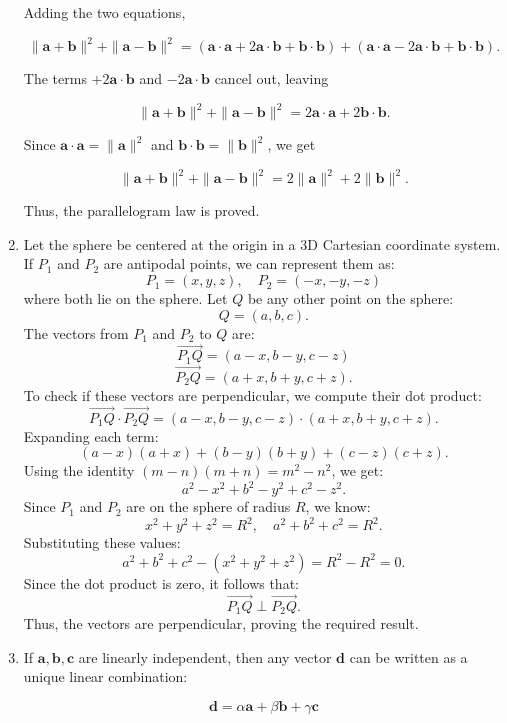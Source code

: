 \documentclass[12pt]{article}
\begin{document}
\begin{enumerate}
Adding the two equations,

\[
\|\mathbf{a} + \mathbf{b}\|^2 + \|\mathbf{a} - \mathbf{b}\|^2 =
(\mathbf{a} \cdot \mathbf{a} + 2 \mathbf{a} \cdot \mathbf{b} + \mathbf{b} \cdot \mathbf{b}) +
(\mathbf{a} \cdot \mathbf{a} - 2 \mathbf{a} \cdot \mathbf{b} + \mathbf{b} \cdot \mathbf{b}).
\]

The terms \(+2 \mathbf{a} \cdot \mathbf{b}\) and \(-2 \mathbf{a} \cdot \mathbf{b}\) cancel out, leaving

\[
\|\mathbf{a} + \mathbf{b}\|^2 + \|\mathbf{a} - \mathbf{b}\|^2 = 2 \mathbf{a} \cdot \mathbf{a} + 2 \mathbf{b} \cdot \mathbf{b}.
\]

Since \(\mathbf{a} \cdot \mathbf{a} = \|\mathbf{a}\|^2\) and \(\mathbf{b} \cdot \mathbf{b} = \|\mathbf{b}\|^2\), we get

\[
\|\mathbf{a} + \mathbf{b}\|^2 + \|\mathbf{a} - \mathbf{b}\|^2 = 2 \|\mathbf{a}\|^2 + 2 \|\mathbf{b}\|^2.
\]

Thus, the parallelogram law is proved.
\item 
Let the sphere be centered at the origin in a 3D Cartesian coordinate system. If \( P_1 \) and \( P_2 \) are antipodal points, we can represent them as:
\[
P_1 = (x, y, z), \quad P_2 = (-x, -y, -z)
\]
where both lie on the sphere. Let \( Q \) be any other point on the sphere:
\[
Q = (a, b, c).
\]
The vectors from \( P_1 \) and \( P_2 \) to \( Q \) are:
\[
\overrightarrow{P_1Q} = (a-x, b-y, c-z)
\]
\[
\overrightarrow{P_2Q} = (a+x, b+y, c+z).
\]
To check if these vectors are perpendicular, we compute their dot product:
\[
\overrightarrow{P_1Q} \cdot \overrightarrow{P_2Q} = (a-x, b-y, c-z) \cdot (a+x, b+y, c+z).
\]
Expanding each term:
\[
(a-x)(a+x) + (b-y)(b+y) + (c-z)(c+z).
\]
Using the identity \( (m-n)(m+n) = m^2 - n^2 \), we get:
\[
a^2 - x^2 + b^2 - y^2 + c^2 - z^2.
\]
Since \( P_1 \) and \( P_2 \) are on the sphere of radius \( R \), we know:
\[
x^2 + y^2 + z^2 = R^2, \quad a^2 + b^2 + c^2 = R^2.
\]
Substituting these values:
\[
a^2 + b^2 + c^2 - (x^2 + y^2 + z^2) = R^2 - R^2 = 0.
\]
Since the dot product is zero, it follows that:
\[
\overrightarrow{P_1Q} \perp \overrightarrow{P_2Q}.
\]
Thus, the vectors are perpendicular, proving the required result.

\item If \(\mathbf{a}, \mathbf{b}, \mathbf{c}\) are linearly independent, then any vector \(\mathbf{d}\) can be written as a unique linear combination:

\[
\mathbf{d} = \alpha \mathbf{a} + \beta \mathbf{b} + \gamma \mathbf{c}
\]


\end{enumerate}
\end{document}
